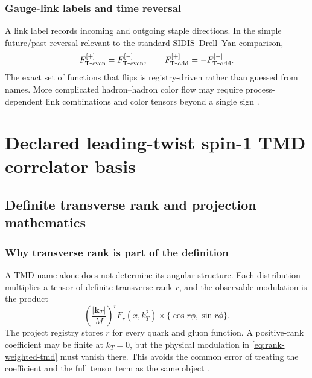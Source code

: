 \documentclass[11pt,oneside]{book}
\newcommand{\kT}{\bm{k}_{T}}
\begin{document}
\section{Gauge-link labels and time reversal}

A link label records incoming and outgoing staple directions.  In the simple future/past reversal relevant to the standard SIDIS--Drell--Yan comparison,
\begin{equation}
 F_{\rm T\mbox{-}even}^{[+]}=F_{\rm T\mbox{-}even}^{[-]},
 \qquad
 F_{\rm T\mbox{-}odd}^{[+]}=-F_{\rm T\mbox{-}odd}^{[-]}.
 \label{eq:link-reversal}
\end{equation}
The exact set of functions that flips is registry-driven rather than guessed from names.  More complicated hadron--hadron color flow may require process-dependent link combinations and color tensors beyond a single sign \cite{BrodskyHwangSchmidt2002,Collins2002SignChange,BoerMuldersPijlman2003,BomhofMuldersPijlman2004}.

\part{Declared leading-twist spin-1 TMD correlator basis}

\chapter{Definite transverse rank and projection mathematics}
\label{chap:rank}

\section{Why transverse rank is part of the definition}

A TMD name alone does not determine its angular structure.  Each distribution multiplies a tensor of definite transverse rank $r$, and the observable modulation is the product
\begin{equation}
 \left(\frac{|\kT|}{M}\right)^r F_r(x,k_T^2)
 \times\{\cos r\phi,\sin r\phi\}.
 \label{eq:rank-weighted-tmd}
\end{equation}
The project registry stores $r$ for every quark and gluon function.  A positive-rank coefficient may be finite at $k_T=0$, but the physical modulation in \cref{eq:rank-weighted-tmd} must vanish there.  This avoids the common error of treating the coefficient and the full tensor term as the same object \cite{VanDaal2016,BuffingMukherjeeMulders2013}.
\end{document}
